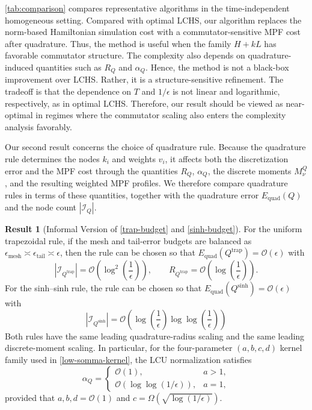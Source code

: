 \documentclass[10pt,reqno]{article}
\numberwithin{equation}{section}
\theoremstyle{plain}
\theoremstyle{definition}
\newtheorem{result}[thm]{Result}
\begin{document}
\cref{tab:comparison} compares representative algorithms in the time-independent homogeneous setting. Compared with optimal LCHS, our algorithm replaces the norm-based Hamiltonian simulation cost with a commutator-sensitive MPF cost after quadrature. Thus, the method is useful when the family \(H+kL\) has favorable commutator structure. The complexity also depends on quadrature-induced quantities such as \(R_Q\) and \(\alpha_Q\). Hence, the method is not a black-box improvement over LCHS. Rather, it is a structure-sensitive refinement. The tradeoff is that the dependence on \(T\) and \(1/\epsilon\) is not linear and logarithmic, respectively, as in optimal LCHS. Therefore, our result should be viewed as near-optimal in regimes where the commutator scaling also enters the complexity analysis favorably. 

Our second result concerns the choice of quadrature rule. Because the quadrature rule determines the nodes \(k_i\) and weights \(v_i\), it affects both the discretization error and the MPF cost through the quantities \(R_Q\), \(\alpha_Q\), the discrete moments \(M_\nu^Q\), and the resulting weighted MPF profiles. We therefore compare quadrature rules in terms of these quantities, together with the quadrature error \(E_{\operatorname{quad}}(Q)\) and the node count \(|\mathcal I_Q|\). 


\begin{result}[Informal Version of \cref{trap-budget} and \cref{sinh-budget}]
For the uniform trapezoidal rule, if the mesh and tail-error budgets are balanced as \(\epsilon_{\operatorname{mesh}} \asymp \epsilon_{\operatorname{tail}} \asymp \epsilon\), then the rule can be chosen so that \(E_{\operatorname{quad}}\!\left(Q^{\operatorname{trap}}\right)=\mathcal O(\epsilon)\) with
\begin{equation}
\left|\mathcal I_{Q^{\operatorname{trap}}}\right|
= \mathcal O\!\left(\log^{2}\!\left(\frac1{\epsilon}\right)\right),
\qquad
R_{Q^{\operatorname{trap}}}
= \mathcal O\!\left(\log\!\left(\frac1{\epsilon}\right)\right).
\end{equation}
For the sinh--sinh rule, the rule can be chosen so that \(E_{\operatorname{quad}}\!\left(Q^{\operatorname{sinh}}\right)=\mathcal O(\epsilon)\) with
\begin{equation}
\left|\mathcal I_{Q^{\operatorname{sinh}}}\right|
= \mathcal O\!\left(
\log\!\left(\frac1{\epsilon}\right)
\log\log\!\left(\frac1{\epsilon}\right)
\right)
\end{equation}
Both rules have the same leading quadrature-radius scaling and the same leading discrete-moment scaling. In particular, for the four-parameter \((a,b,c,d)\) kernel family used in
\cref{low-somma-kernel}, the LCU normalization satisfies
\begin{equation}
\alpha_Q
=
\begin{cases}
\mathcal O(1), & a>1,\\[1mm]
\mathcal O\!\left(\log\log(1/\epsilon)\right), & a=1,
\end{cases}
\end{equation}
provided that \(a,b,d=\mathcal O(1)\) and $c= \Omega  (\sqrt{\log(1/\epsilon)} )$. 
\end{result}
\end{document}
